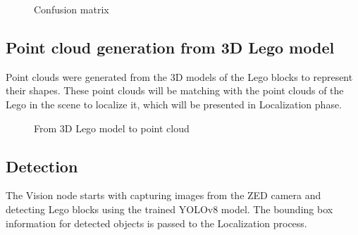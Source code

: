 \documentclass{article}
\begin{document}
	\begin{figure}[H]
		\centering
		\caption{Confusion matrix}
		\label{fig:confusion_matrix}
	\end{figure}
	
	\subsection{Point cloud generation from 3D Lego model}
	Point clouds were generated from the 3D models of the Lego blocks to represent their shapes. These point clouds will be matching with the point clouds of the Lego in the scene to localize it, which will be presented in Localization phase.
	
	\begin{figure}[H]
		\centering
		\caption{From 3D Lego model to point cloud}
		\label{fig:pointcloud-from-3d}
	\end{figure}
	
	\subsection{Detection}
	The Vision node starts with capturing images from the ZED camera and detecting Lego blocks using the trained YOLOv8 model. The bounding box information for detected objects is passed to the Localization process.
	
\end{document}
